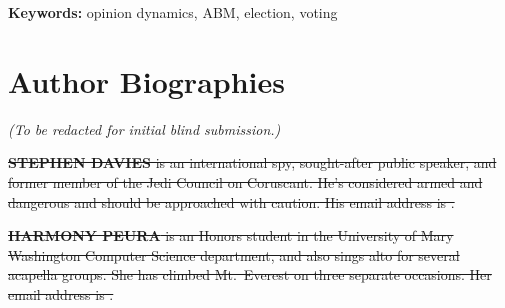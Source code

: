 \documentclass{scspaperproc}
\begin{document}
\textbf{Keywords:} opinion dynamics, ABM, election, voting
















\section*{Author Biographies}

\textit{(To be redacted for initial blind submission.)}

\sout{\textbf{\uppercase{Stephen Davies}} is an international spy, sought-after
public speaker, and former member of the Jedi Council on Coruscant. He's
considered armed and dangerous and should be approached with caution.
His email address is .}

\sout{\textbf{\uppercase{Harmony Peura}} is an Honors student in the University of
Mary Washington Computer Science department, and also sings alto for several
acapella groups. She has climbed Mt.~Everest on three separate occasions. Her
email address is .}
\end{document}
